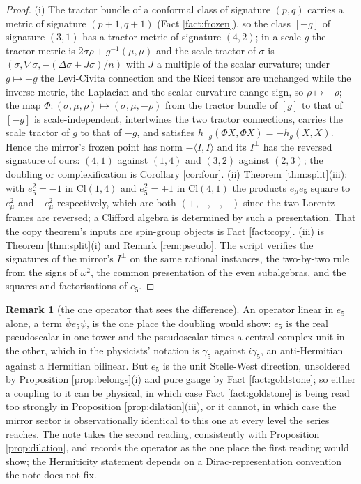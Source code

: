 \documentclass[11pt]{article}
\theoremstyle{definition}
\newtheorem{remark}[theorem]{Remark}
\newcommand{\Cl}{\mathrm{Cl}}
\newcommand{\ip}[2]{\langle #1, #2\rangle}
\begin{document}
\begin{proof}
(i) The tractor bundle of a conformal class of signature $(p,q)$ carries a metric of signature $(p+1,q+1)$ (Fact \ref{fact:frozen}), so the class $[-g]$ of signature $(3,1)$ has a tractor metric of signature $(4,2)$; in a scale $g$ the tractor metric is $2\sigma\rho + g^{-1}(\mu,\mu)$ and the scale tractor of $\sigma$ is $(\sigma, \nabla\sigma, -(\Delta\sigma + J\sigma)/n)$ with $J$ a multiple of the scalar curvature; under $g \mapsto -g$ the Levi-Civita connection and the Ricci tensor are unchanged while the inverse metric, the Laplacian and the scalar curvature change sign, so $\rho \mapsto -\rho$; the map $\Phi: (\sigma, \mu, \rho) \mapsto (\sigma, \mu, -\rho)$ from the tractor bundle of $[g]$ to that of $[-g]$ is scale-independent, intertwines the two tractor connections, carries the scale tractor of $g$ to that of $-g$, and satisfies $h_{-g}(\Phi X, \Phi X) = -h_{g}(X, X)$. Hence the mirror's frozen point has norm $-\ip{I}{I}$ and its $I^{\perp}$ has the reversed signature of ours: $(4,1)$ against $(1,4)$ and $(3,2)$ against $(2,3)$; the doubling or complexification is Corollary \ref{cor:four}. (ii) Theorem \ref{thm:split}(iii): with $e_{5}^{2} = -1$ in $\Cl(1,4)$ and $e_{5}^{2} = +1$ in $\Cl(4,1)$ the products $e_{\mu}e_{5}$ square to $e_{\mu}^{2}$ and $-e_{\mu}^{2}$ respectively, which are both $(+,-,-,-)$ since the two Lorentz frames are reversed; a Clifford algebra is determined by such a presentation. That the copy theorem's inputs are spin-group objects is Fact \ref{fact:copy}. (iii) is Theorem \ref{thm:split}(i) and Remark \ref{rem:pseudo}. The script verifies the signatures of the mirror's $I^{\perp}$ on the same rational instances, the two-by-two rule from the signs of $\omega^{2}$, the common presentation of the even subalgebras, and the squares and factorisations of $e_{5}$.
\end{proof}

\begin{remark}[the one operator that sees the difference]\label{rem:onesees}
An operator linear in $e_{5}$ alone, a term $\bar\psi e_{5}\psi$, is the one place the doubling would show: $e_{5}$ is the real pseudoscalar in one tower and the pseudoscalar times a central complex unit in the other, which in the physicists' notation is $\gamma_{5}$ against $i\gamma_{5}$, an anti-Hermitian against a Hermitian bilinear. But $e_{5}$ is the unit Stelle-West direction, unsoldered by Proposition \ref{prop:belongs}(i) and pure gauge by Fact \ref{fact:goldstone}; so either a coupling to it can be physical, in which case Fact \ref{fact:goldstone} is being read too strongly in Proposition \ref{prop:dilation}(iii), or it cannot, in which case the mirror sector is observationally identical to this one at every level the series reaches. The note takes the second reading, consistently with Proposition \ref{prop:dilation}, and records the operator as the one place the first reading would show; the Hermiticity statement depends on a Dirac-representation convention the note does not fix.
\end{remark}
\end{document}
